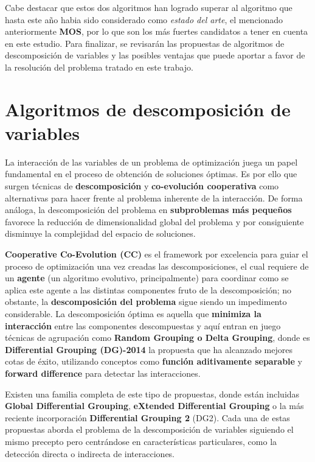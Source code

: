 Cabe destacar que estos dos algoritmos han logrado superar al algoritmo que hasta este año habia sido considerado como \textit{estado del arte}, el mencionado anteriormente \textbf{MOS}, por lo que son los más fuertes candidatos a tener en cuenta en este estudio. Para finalizar, se revisarán las propuestas de algoritmos de descomposición de variables y las posibles ventajas que puede aportar a favor de la resolución del problema tratado en este trabajo.

\section{Algoritmos de descomposición de variables}

La interacción de las variables de un problema de optimización juega un papel fundamental en el proceso de obtención de soluciones óptimas. Es por ello que surgen técnicas de \textbf{descomposición} y \textbf{co-evolución cooperativa} como alternativas para hacer frente al problema inherente de la interacción. De forma análoga, la descomposición del problema en \textbf{subproblemas más pequeños} favorece la reducción de dimensionalidad global del problema y por consiguiente disminuye la complejidad del espacio de soluciones.

\textbf{Cooperative Co-Evolution (CC)}\cite{CCoevo} es el framework por excelencia para guiar el proceso de optimización una vez creadas las descomposiciones, el cual requiere de un \textbf{agente} (un algoritmo evolutivo, principalmente) para coordinar como se aplica este agente a las distintas componentes fruto de la descomposición; no obstante, la \textbf{descomposición del problema} sigue siendo un impedimento considerable. La descomposición óptima es aquella que \textbf{minimiza la interacción} entre las componentes descompuestas y aquí entran en juego técnicas de agrupación como \textbf{Random Grouping o Delta Grouping}, donde es \textbf{Differential Grouping (DG)-2014} \cite{DG} la propuesta que ha alcanzado mejores cotas de éxito, utilizando conceptos como \textbf{función aditivamente separable} y \textbf{forward difference} para detectar las interacciones.

Existen una familia completa de este tipo de propuestas, donde están incluidas  \textbf{Global Differential Grouping}\cite{GDG}, \textbf{eXtended Differential Grouping}\cite{XDG} o la más reciente incorporación \textbf{Differential Grouping 2} (DG2)\cite{DG2}. Cada una de estas propuestas aborda el problema de la descomposición de variables siguiendo el mismo precepto pero centrándose en características particulares, como la detección directa o indirecta de interacciones. 

